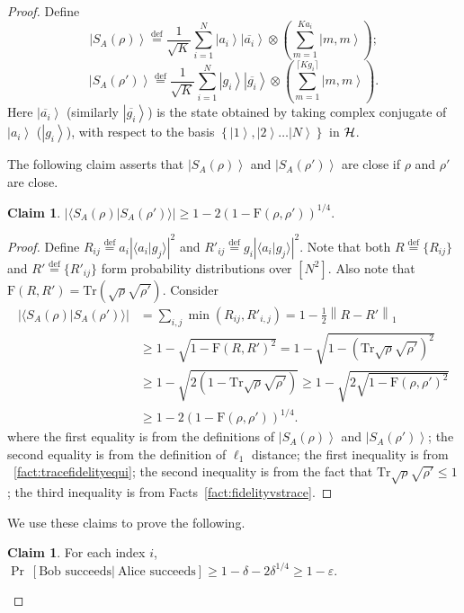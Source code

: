 \documentclass[11pt,a4paper]{article}
\def\F{\mathrn{F}}
\def\H{\CMcal{H}}
\theoremstyle{plain}
\theoremstyle{definition}
\newtheorem{claim}[theorem]{Claim}
\newcommand {\Br} [1] {\ensuremath{ \left[ #1 \right] }}
\newcommand {\minusspace} {\: \! \!}
\newcommand {\Fn} [2] {\ensuremath{ #1 \minusspace \Br{ #2 } }}
\newcommand {\defeq} {\ensuremath{ \stackrel{\mathrm{def}}{=} }}
\newcommand {\prob} [1] {\Fn{\Pr}{#1}}
\newcommand {\abs} [1] {\ensuremath{ \left| #1 \right| }}
\newcommand {\norm} [1] {\ensuremath{ \left\| #1 \right\| }}
\newcommand {\normsub} [2] {\ensuremath{ \norm{#1}_{#2} }}
\newcommand {\onenorm} [1] {\normsub{#1}{1}}
\newcommand {\ket} [1] {\ensuremath{ \left| #1 \right\rangle }}
\newcommand {\Tr} {\ensuremath{ \mathrm{Tr} }}
\newcommand {\myqedhere} {\tag*{\qedhere}}
\newcommand {\set} [1] {\ensuremath{ \left\lbrace #1 \right\rbrace }}
\def\ve{{\varepsilon}}
\def\F{\mathrm{F}}
\newcommand{\conjugate}[1]{\overline{#1}}
\newcommand{\braket}[2]{\langle#1|#2\rangle}
\begin{document}
\begin{proof}
Define 
$$\ket{S_A(\rho)}\defeq \frac{1}{\sqrt{K}}\sum_{i=1}^N\ket{a_i}\ket{\conjugate{a_i}}\otimes \left(\sum_{m=1}^{Ka_i}\ket{m, m}\right) ; $$
$$\ket{S_A(\rho')}\defeq\frac{1}{\sqrt{K}}\sum_{i=1}^N\ket{g_i}\ket{\conjugate{g_i}}\otimes \left(\sum_{m=1}^{\lceil Kg_i \rceil}\ket{m, m} \right) .$$
Here $\ket{\conjugate{a_i}}$ (similarly $\ket{\conjugate{g_i}}$) is the state obtained by taking complex conjugate of  $\ket{a_i}$ ($\ket{g_i}$), with respect to the basis $\set{\ket{1},\ket{2}\ldots \ket{N}}$ in $\H$.  

The following claim asserts that $\ket{S_A(\rho)}$ and $\ket{S_A(\rho')}$ are close if $\rho$ and $\rho'$ are close.
\begin{claim}\label{claim:2}
$\abs{\braket{S_A(\rho)}{S_A(\rho')}} \geq 1- 2 (1-\F(\rho,\rho'))^{1/4} .$
\end{claim}
\begin{proof}
Define $R_{ij}\defeq a_i \abs{\braket{a_i}{g_j}}^2$ and $R'_{ij}\defeq g_i \abs{\braket{a_i}{g_j}}^2$. Note that both $R \defeq \{R_{ij}\}$ and $R' \defeq \{R'_{ij}\}$ form probability distributions over $[N^2]$. Also note that $\F(R,R') = \Tr(\sqrt{\rho}\sqrt{\rho'})$. Consider
\begin{align*}
 \abs{\braket{S_A(\rho)}{S_A(\rho')}} & =\sum_{i,j}\min(R_{ij},R'_{i,j}) = 1 - \frac{1}{2}\onenorm{R-R'} \nonumber\\
 & \geq 1 - \sqrt{1-\F(R,R')^2} = 1 - \sqrt{1-(\Tr \sqrt{\rho}\sqrt{\rho'})^2} \nonumber \\
 & \geq 1 - \sqrt{2(1- \Tr \sqrt{\rho}\sqrt{\rho'})} \geq  1- \sqrt{2 \sqrt{1-\F(\rho,\rho')^2}}  \nonumber \\
 & \geq 1- 2 (1-\F(\rho,\rho'))^{1/4} . \myqedhere 
  \end{align*}
where the first equality is from the definitions of $\ket{S_A(\rho)}$ and $\ket{S_A(\rho')}$; the second equality is from the definition of $\ell_1$ distance; the first inequality is from ~\ref{fact:tracefidelityequi}; the second inequality is from the fact that $\Tr\sqrt{\rho}\sqrt{\rho'}\leq 1$; the third inequality is from Facts~\ref{fact:fidelityvstrace}.
\end{proof}
We use these claims to prove the following.
\begin{claim}
\label{claim:relativeprob}
For each index $i$, $\prob{\text{Bob succeeds}|~\text{Alice succeeds}}\geq 1 - \delta -  2 \delta^{1/4} \geq 1 - \ve $.
\end{claim}


\end{proof}
\end{document}
